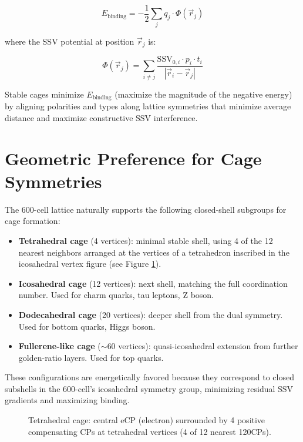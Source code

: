 \documentclass[11pt]{article}
\begin{document}
\begin{equation}
E_{\text{binding}} = -\frac{1}{2} \sum_{j} q_j \cdot \Phi(\vec{r}_j)
\label{eq:binding_energy}
\end{equation}

where the SSV potential at position $\vec{r}_j$ is:

\begin{equation}
\Phi(\vec{r}_j) = \sum_{i \neq j} \frac{\text{SSV}_{0,i} \cdot p_i \cdot t_i}{|\vec{r}_i - \vec{r}_j|}
\label{eq:ssv_potential}
\end{equation}

Stable cages minimize $E_{\text{binding}}$ (maximize the magnitude of the negative energy) by aligning polarities and types along lattice symmetries that minimize average distance and maximize constructive SSV interference.

\section{Geometric Preference for Cage Symmetries}

The 600-cell lattice naturally supports the following closed-shell subgroups for cage formation:

\begin{itemize}
    \item \textbf{Tetrahedral cage} (4 vertices): minimal stable shell, using 4 of the 12 nearest neighbors arranged at the vertices of a tetrahedron inscribed in the icosahedral vertex figure (see Figure \ref{fig:tetrahedral-cage}).
    \item \textbf{Icosahedral cage} (12 vertices): next shell, matching the full coordination number. Used for charm quarks, tau leptons, Z boson.
    \item \textbf{Dodecahedral cage} (20 vertices): deeper shell from the dual symmetry. Used for bottom quarks, Higgs boson.
    \item \textbf{Fullerene-like cage} ($\sim$60 vertices): quasi-icosahedral extension from further golden-ratio layers. Used for top quarks.
\end{itemize}

These configurations are energetically favored because they correspond to closed subshells in the 600-cell’s icosahedral symmetry group, minimizing residual SSV gradients and maximizing binding.

\begin{figure}[h]
\centering
\caption{Tetrahedral cage: central eCP (electron) surrounded by 4 positive compensating CPs at tetrahedral vertices (4 of 12 nearest 120CPs).}
\label{fig:tetrahedral-cage}
\end{figure}
\end{document}
